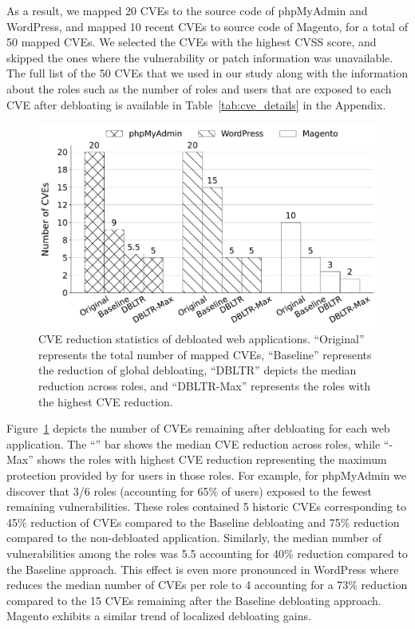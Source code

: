 As a result, we mapped 20 CVEs to the source code of phpMyAdmin and WordPress, and mapped 10 recent CVEs to source code of Magento, for a total of 50 mapped CVEs. 
We selected the CVEs with the highest CVSS score, and skipped the ones where the vulnerability or patch information was unavailable. 
The full list of the 50 CVEs that we used in our study along with the information about the \dbltr{} roles such as the number of roles and users that are exposed to each CVE after debloating is available in Table~\ref{tab:cve_details} in the Appendix. 

\begin{figure}[t]
    \centering
    \includegraphics[width=\linewidth]{figures/dbltr/cve_reduction_spectral_bw.pdf}
    \caption{CVE reduction statistics of debloated web applications. ``Original'' represents the total number of mapped CVEs, ``Baseline'' represents the reduction of global debloating, ``DBLTR'' depicts the median reduction across roles, and ``DBLTR-Max'' represents the roles with the highest CVE reduction.}
    \label{fig:cve_reduction}
\end{figure}

Figure~\ref{fig:cve_reduction} depicts the number of CVEs remaining after debloating for each web application. 
The ``\dbltr{}'' bar shows the median CVE reduction across roles, while ``\dbltr{}-Max'' shows the roles with highest CVE reduction representing the maximum protection provided by \dbltr{} for users in those roles. 
For example, for phpMyAdmin we discover that 3/6 roles (accounting for 65\% of users) exposed to the fewest remaining vulnerabilities. 
These roles contained 5 historic CVEs corresponding to 45\% reduction of CVEs compared to the Baseline debloating and 75\% reduction compared to the non-debloated application. 
Similarly, the median number of vulnerabilities among the roles was 5.5 accounting for 40\% reduction compared to the Baseline approach. 
This effect is even more pronounced in WordPress where \dbltr{} reduces the median number of CVEs per role to 4 accounting for a 73\% reduction compared to the 15 CVEs remaining after the Baseline debloating approach. 
Magento exhibits a similar trend of localized debloating gains.


